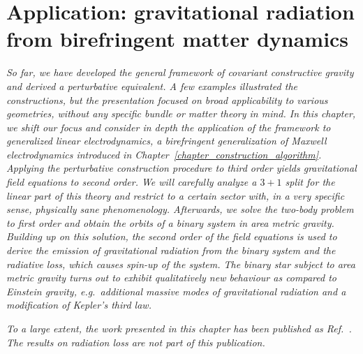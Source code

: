 \chapter{Application: gravitational radiation from birefringent matter dynamics}
\label{chapter_weak_area}

\textit{So far, we have developed the general framework of covariant constructive gravity and derived a perturbative equivalent. A few examples illustrated the constructions, but the presentation focused on broad applicability to various geometries, without any specific bundle or matter theory in mind. In this chapter, we shift our focus and consider in depth the application of the framework to generalized linear electrodynamics, a birefringent generalization of Maxwell electrodynamics introduced in Chapter~\ref{chapter_construction_algorithm}. Applying the perturbative construction procedure to third order yields gravitational field equations to second order. We will carefully analyze a $3+1$ split for the linear part of this theory and restrict to a certain sector with, in a very specific sense, physically sane phenomenology. Afterwards, we solve the two-body problem to first order and obtain the orbits of a binary system in area metric gravity. Building up on this solution, the second order of the field equations is used to derive the emission of gravitational radiation from the binary system and the radiative loss, which causes spin-up of the system. The binary star subject to area metric gravity turns out to exhibit qualitatively new behaviour as compared to Einstein gravity, e.g.~additional massive modes of gravitational radiation and a modification of Kepler's third law.}

\textit{To a large extent, the work presented in this chapter has been published as Ref.~\cite{Alex_2020_2}. The results on radiation loss are not part of this publication.}

